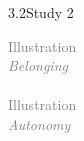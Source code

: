 \documentclass[xcolor=table,9pt,aspectratio=169]{beamer}
\begin{document}
\begin{frame}{\vspace*{10mm}3.2\hspace*{1em}Study 2}
\begin{multicols}{4}
\begin{center}
      \textcolor{gray}{Illustration\\\textit{Belonging}}\\
      \\
      \textcolor{gray}{Illustration\\\textit{Autonomy}}\\
   \end{center}
\end{multicols}
\end{frame}
\end{document}
